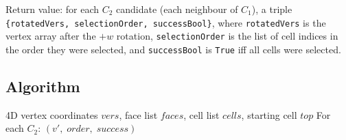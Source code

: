 \documentclass[12pt,a4paper]{article}
\theoremstyle{definition}
\begin{document}
Return value: for each $C_2$ candidate (each neighbour of $C_1$), a triple
\texttt{\{rotatedVers, selectionOrder, successBool\}}, where
\texttt{rotatedVers} is the vertex array after the $+w$ rotation,
\texttt{selectionOrder} is the list of cell indices in the order they were
selected, and \texttt{successBool} is \texttt{True} iff all cells were
selected.

\subsection{Algorithm}

\begin{algorithm}[h]
\caption{peeling4Df (4D greedy version)}
\label{alg:4d}
\begin{algorithmic}[1]
\Require 4D vertex coordinates $\mathit{vers}$, face list $\mathit{faces}$,
         cell list $\mathit{cells}$, starting cell $\mathit{top}$
\Ensure For each $C_2$: $(v',\; \mathit{order},\; \mathit{success})$


\end{algorithmic}
\end{algorithm}
\end{document}
